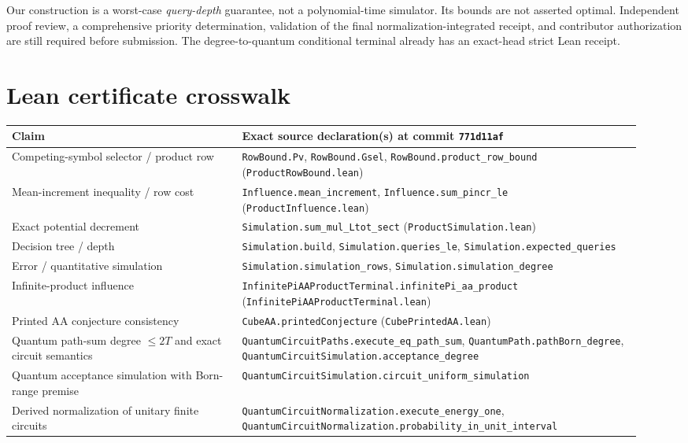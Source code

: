 \documentclass[11pt]{article}
\begin{document}
Our construction is a worst-case \emph{query-depth} guarantee, not a polynomial-time simulator. Its bounds are not asserted optimal. Independent proof review, a comprehensive priority determination, validation of the final normalization-integrated receipt, and contributor authorization are still required before submission. The degree-to-quantum conditional terminal already has an exact-head strict Lean receipt.

\section{Lean certificate crosswalk}
\small
\begin{tabular}{@{}p{0.34\linewidth}p{0.59\linewidth}@{}}
\toprule
Claim & Exact source declaration(s) at commit \texttt{771d11af} \\
\midrule
Competing-symbol selector / product row
& \texttt{RowBound.Pv}, \texttt{RowBound.Gsel}, \texttt{RowBound.product\_row\_bound} (\texttt{ProductRowBound.lean}) \\
Mean-increment inequality / row cost
& \texttt{Influence.mean\_increment}, \texttt{Influence.sum\_pincr\_le} (\texttt{ProductInfluence.lean})\\
Exact potential decrement
& \texttt{Simulation.sum\_mul\_Ltot\_sect} (\texttt{ProductSimulation.lean})\\
Decision tree / depth
& \texttt{Simulation.build}, \texttt{Simulation.queries\_le}, \texttt{Simulation.expected\_queries}\\
Error / quantitative simulation
& \texttt{Simulation.simulation\_rows}, \texttt{Simulation.simulation\_degree}\\
Infinite-product influence
& \texttt{InfinitePiAAProductTerminal.infinitePi\_aa\_product} (\texttt{InfinitePiAAProductTerminal.lean})\\
Printed AA conjecture consistency
& \texttt{CubeAA.printedConjecture} (\texttt{CubePrintedAA.lean})\\
Quantum path-sum degree $\le2T$ and exact circuit semantics
& \texttt{QuantumCircuitPaths.execute\_eq\_path\_sum}, \texttt{QuantumPath.pathBorn\_degree}, \texttt{QuantumCircuitSimulation.acceptance\_degree}\\
Quantum acceptance simulation with Born-range premise
& \texttt{QuantumCircuitSimulation.circuit\_uniform\_simulation}\\
Derived normalization of unitary finite circuits
& \texttt{QuantumCircuitNormalization.execute\_energy\_one}, \texttt{QuantumCircuitNormalization.probability\_in\_unit\_interval}\\
\bottomrule
\end{tabular}
\normalsize
\end{document}
